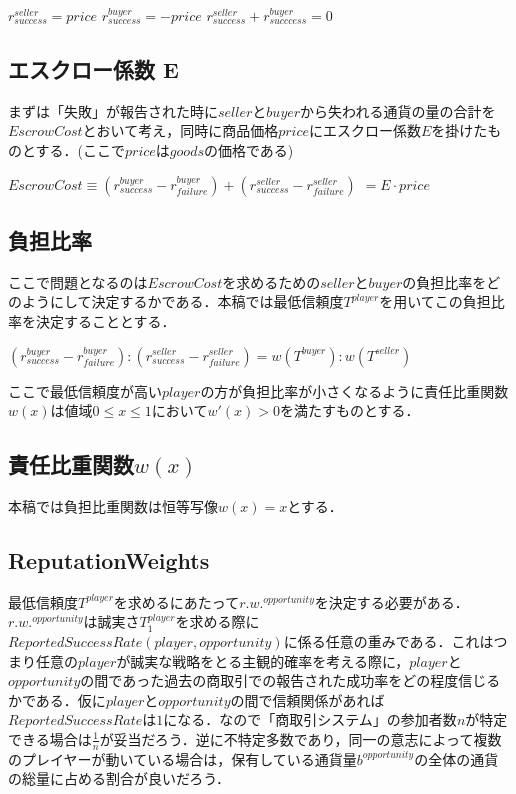 \documentclass[twocolumn, a4j]{article}
\begin{document}
$ r^{seller}_{success} = price $
$ r^{buyer}_{success} = -price $
$ r^{seller}_{success} + r^{buyer}_{succcess} = 0 $

\subsection{エスクロー係数 E}
まずは「失敗」が報告された時に$ seller $と$ buyer $から失われる通貨の量の合計を$ EscrowCost $とおいて考え，同時に商品価格$ price $にエスクロー係数$ E $を掛けたものとする．(ここで$ price $は$ goods $の価格である)

$ EscrowCost \equiv (r^{buyer}_{success} - r^{buyer}_{failure}) + (r^{seller}_{success} - r^{seller}_{failure}) $
$ = E \cdot price $

\subsection{負担比率}
ここで問題となるのは$ EscrowCost $を求めるための$ seller $と$ buyer $の負担比率をどのようにして決定するかである．本稿では最低信頼度$ T^{player} $を用いてこの負担比率を決定することとする．

$ (r^{buyer}_{success} - r^{buyer}_{failure}):(r^{seller}_{success} - r^{seller}_{failure}) = w(T^{buyer}):w(T^{seller}) $

ここで最低信頼度が高い$ player $の方が負担比率が小さくなるように責任比重関数$ w(x) $は値域$ 0 \leq  x \leq 1 $において$ w'(x)>0 $を満たすものとする．

\subsection{責任比重関数$ w(x) $}
本稿では負担比重関数は恒等写像$ w(x)=x $とする．

\subsection{ReputationWeights}
最低信頼度$ T^{player} $を求めるにあたって$ r.w.^{opportunity} $を決定する必要がある．$ r.w.^{opportunity} $は誠実さ$ T^{player}_1 $を求める際に$ ReportedSuccessRate(player, opportunity) $に係る任意の重みである．これはつまり任意の$ player $が誠実な戦略をとる主観的確率を考える際に，$ player $と$ opportunity $の間であった過去の商取引での報告された成功率をどの程度信じるかである．仮に$ player $と$ opportunity $の間で信頼関係があれば$ ReportedSuccessRate $は$ 1 $になる．なので「商取引システム」の参加者数$ n $が特定できる場合は$ \frac{1}{n} $が妥当だろう．逆に不特定多数であり，同一の意志によって複数のプレイヤーが動いている場合は，保有している通貨量$ b^{opportunity} $の全体の通貨の総量に占める割合が良いだろう．
\end{document}

